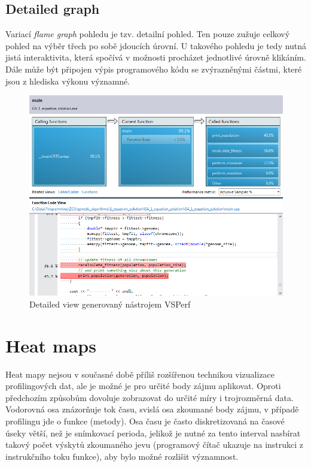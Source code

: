 \documentclass[czech,BP]{thesiskiv}
\begin{document}
\subsection{Detailed graph}

Variací \emph{flame graph} pohledu je tzv. detailní pohled. Ten pouze zužuje celkový pohled na výběr třech po sobě jdoucích úrovní. U takového pohledu je tedy nutná jistá interaktivita, která spočívá v možnosti procházet jednotlivé úrovně klikáním. Dále může být připojen výpis programového kódu se zvýrazněnými částmi, které jsou z hlediska výkonu významné.

\begin{figure}[h]
    \centering
    \includegraphics[interpolate,width=1.0\textwidth]{img/prof_detailgraph.png}
    \caption{Detailed view generovaný nástrojem VSPerf}
    \label{obr:detailview}
\end{figure}

\section {Heat maps}

Heat mapy nejsou v současné době příliš rozšířenou technikou vizualizace profilingových dat, ale je možné je pro určité body zájmu aplikovat. Oproti předchozím způsobům dovoluje zobrazovat do určité míry i trojrozměrná data. Vodorovná osa znázorňuje tok času, svislá osa zkoumané body zájmu, v případě profilingu jde o funkce (metody). Osa času je často diskretizovaná na časové úseky větší, než je snímkovací perioda, jelikož je nutné za tento interval nasbírat takový počet výskytů zkoumaného jevu (programový čítač ukazuje na instrukci z instrukčního toku funkce), aby bylo možné rozlišit významnost.
\end{document}
